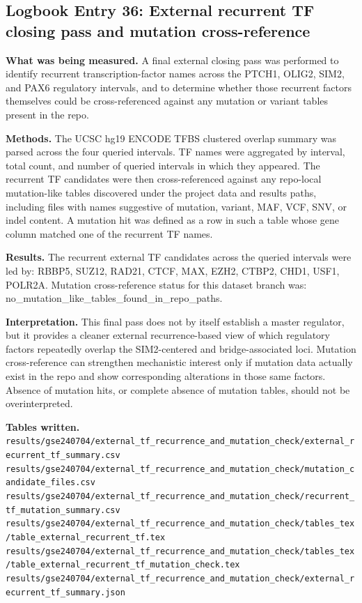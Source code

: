 \subsection*{Logbook Entry 36: External recurrent TF closing pass and mutation cross-reference}

\textbf{What was being measured.}
A final external closing pass was performed to identify recurrent transcription-factor names across the PTCH1, OLIG2, SIM2, and PAX6 regulatory intervals, and to determine whether those recurrent factors themselves could be cross-referenced against any mutation or variant tables present in the repo.

\textbf{Methods.}
The UCSC hg19 ENCODE TFBS clustered overlap summary was parsed across the four queried intervals. TF names were aggregated by interval, total count, and number of queried intervals in which they appeared. The recurrent TF candidates were then cross-referenced against any repo-local mutation-like tables discovered under the project data and results paths, including files with names suggestive of mutation, variant, MAF, VCF, SNV, or indel content. A mutation hit was defined as a row in such a table whose gene column matched one of the recurrent TF names.

\textbf{Results.}
The recurrent external TF candidates across the queried intervals were led by: RBBP5, SUZ12, RAD21, CTCF, MAX, EZH2, CTBP2, CHD1, USF1, POLR2A.
Mutation cross-reference status for this dataset branch was: no\_mutation\_like\_tables\_found\_in\_repo\_paths.

\textbf{Interpretation.}
This final pass does not by itself establish a master regulator, but it provides a cleaner external recurrence-based view of which regulatory factors repeatedly overlap the SIM2-centered and bridge-associated loci. Mutation cross-reference can strengthen mechanistic interest only if mutation data actually exist in the repo and show corresponding alterations in those same factors. Absence of mutation hits, or complete absence of mutation tables, should not be overinterpreted.

\textbf{Tables written.}
\texttt{results/gse240704/external\_tf\_recurrence\_and\_mutation\_check/external\_recurrent\_tf\_summary.csv}\\
\texttt{results/gse240704/external\_tf\_recurrence\_and\_mutation\_check/mutation\_candidate\_files.csv}\\
\texttt{results/gse240704/external\_tf\_recurrence\_and\_mutation\_check/recurrent\_tf\_mutation\_summary.csv}\\
\texttt{results/gse240704/external\_tf\_recurrence\_and\_mutation\_check/tables\_tex/table\_external\_recurrent\_tf.tex}\\
\texttt{results/gse240704/external\_tf\_recurrence\_and\_mutation\_check/tables\_tex/table\_external\_recurrent\_tf\_mutation\_check.tex}\\
\texttt{results/gse240704/external\_tf\_recurrence\_and\_mutation\_check/external\_recurrent\_tf\_summary.json}

